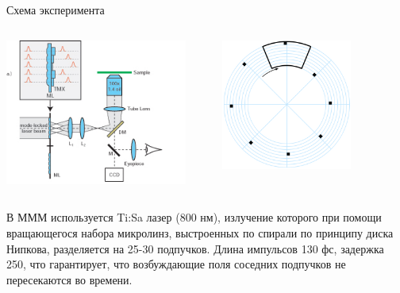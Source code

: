 \documentclass[9pt, compress, xcolor=table]{beamer}
\begin{document}
\begin{frame}{Схема эксперимента}
\begin{columns}[c]
\column{6.5cm}
\begin{center}
\includegraphics[width=0.9\textwidth]{MMM}
\end{center}
\column{6.5cm}
\begin{center}
\includegraphics[width=0.7\textwidth]{MMM_0}
\end{center}
\end{columns}
В МММ используется Ti:Sa лазер (800 нм), излучение которого при помощи вращающегося набора микролинз, выстроенных по спирали по принципу диска Нипкова, разделяется на 25-30 подпучков. Длина импульсов 130 фс, задержка 250, что гарантирует, что возбуждающие поля соседних подпучков не пересекаются во времени.
\end{frame}
\end{document}
